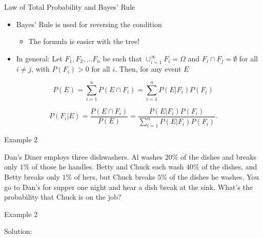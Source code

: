 \documentclass[
  ignorenonframetext,
]{beamer}
\providecommand{\tightlist}{%
  \setlength{\itemsep}{0pt}\setlength{\parskip}{0pt}}
\begin{document}
\begin{frame}{Law of Total Probability and Bayes' Rule}
\protect\hypertarget{law-of-total-probability-and-bayes-rule-1}{}
\begin{itemize}
\item
  Bayes' Rule is used for reversing the condition

  \begin{itemize}
  \tightlist
  \item
    The formula is easier with the tree!
  \end{itemize}
\item
  In general: Let \(F_1, F_2, \ldots F_n\) be such that
  \(\cup_{i=1}^{\infty} F_i=\Omega\) and \(F_i\cap F_j=\emptyset\) for
  all \(i\neq j\), with \(P(F_i)>0\) for all \(i\). Then, for any event
  \(E\)
\end{itemize}

\[P(E)=\sum_{i=1}^n P(E \cap F_i)=\sum_{i=1}^n P(E|F_i)P(F_i)\]

\[P(F_i|E)=\frac{P(E \cap F_i)}{P(E)}=\frac{P(E|F_i)P(F_i)}{\sum_{i=1}^nP(E|F_i)P(F_i)}.\]
\end{frame}

\begin{frame}{Example 2}
\protect\hypertarget{example-2}{}
\begin{tcolorbox}
Dan's Diner employs three dishwashers. Al washes $20\%$ of the dishes and breaks only $1\%$ of those he handles. Betty and Chuck each wash $40\%$ of the dishes, and Betty breaks only $1\%$ of hers, but Chuck breaks $5\%$ of the dishes he washes. You go to Dan's for supper one night and hear a dish break at the sink. What's the probability that Chuck is on the job?


\end{tcolorbox}
\end{frame}

\begin{frame}{Example 2}
\protect\hypertarget{example-2-1}{}
\begin{tcolorbox}
Solution:

\vspace{50mm}


\end{tcolorbox}
\end{frame}
\end{document}
